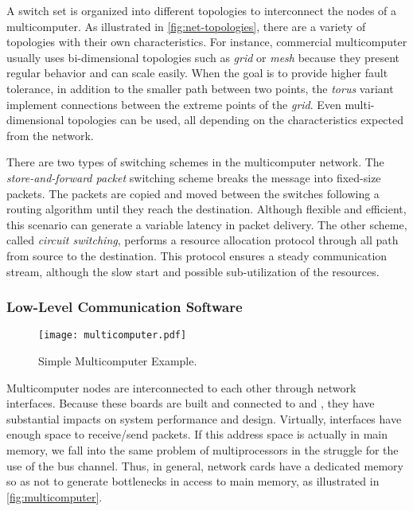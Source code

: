 				A switch set is organized into different topologies to interconnect
				the nodes of a multicomputer.
				As illustrated in \autoref{fig:net-topologies}, there are a
				variety of topologies with their own characteristics.
				For instance, commercial multicomputer usually uses bi-dimensional
				topologies such as \textit{grid} or \textit{mesh} because they present
				regular behavior and can scale easily.
				When the goal is to provide higher fault tolerance, in addition to the
				smaller path between two points, the \textit{torus} variant implement
				connections between the extreme points of the \textit{grid}.
				Even multi-dimensional topologies can be used, all depending on the
				characteristics expected from the network.

				There are two types of switching schemes in the multicomputer network.
				The \textit{store-and-forward packet} switching scheme breaks the message
				into fixed-size packets.
				The packets are copied and moved between the switches following a
				routing algorithm until they reach the destination.
				Although flexible and efficient, this scenario can generate a variable
				latency in packet delivery.
				The other scheme, called \textit{circuit switching}, performs a resource
				allocation protocol through all path from source to the destination.
				This protocol ensures a steady communication stream, although the
				slow start and possible sub-utilization of the resources.

			\subsubsection{Low-Level Communication Software}
			\label{sec.multicomputers-low-sw}

				\begin{figure}[t]
					\centering%
					\caption{Simple Multicomputer Example.}%
					\label{fig:multicomputer}%
					\texttt{[image: multicomputer.pdf]}%
				\end{figure}

				Multicomputer nodes are interconnected to each other through network interfaces.
				Because these boards are built and connected to \cpus and \ram,
				they have substantial impacts on system performance and \os design.
				Virtually, interfaces have enough \ram space to receive/send packets.
				If this address space is actually in main memory, we fall into the same
				problem of multiprocessors in the struggle for the use of the bus channel.
				Thus, in general, network cards have a dedicated memory so as not to
				generate bottlenecks in access to main memory, as illustrated in \autoref{fig:multicomputer}.

